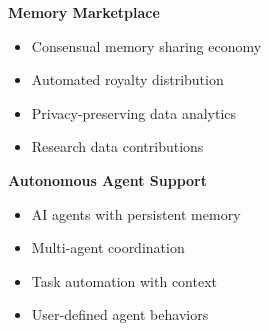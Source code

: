 \documentclass[12pt, a4paper]{article}
\begin{document}
\textbf{Memory Marketplace}
\begin{itemize}
    \item Consensual memory sharing economy
    \item Automated royalty distribution
    \item Privacy-preserving data analytics
    \item Research data contributions
\end{itemize}

\textbf{Autonomous Agent Support}
\begin{itemize}
    \item AI agents with persistent memory
    \item Multi-agent coordination
    \item Task automation with context
    \item User-defined agent behaviors
\end{itemize}









\end{document}
